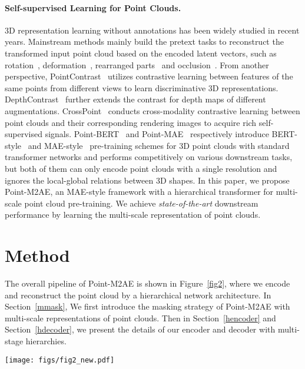 \documentclass{article}
\begin{document}
\paragraph{Self-supervised Learning for Point Clouds.}
3D representation learning without annotations has been widely studied in recent years. Mainstream methods mainly build the pretext tasks to reconstruct the transformed input point cloud based on the encoded latent vectors, such as rotation~\cite{poursaeed2020self}, deformation~\cite{achituve2021self}, rearranged parts~\cite{sauder2019self} and occlusion~\cite{occo}. From another perspective, PointContrast~\cite{pointcontrast} utilizes contrastive learning between features of the same points from different views to learn discriminative 3D representations. DepthContrast~\cite{depthcontrast} further extends the contrast for depth maps of different augmentations. CrossPoint~\cite{afham2022crosspoint} conducts cross-modality contrastive learning between point clouds and their corresponding rendering images to acquire rich self-supervised signals. Point-BERT~\cite{pointbert} and Point-MAE~\cite{pang2022masked} respectively introduce BERT-style~\cite{bert} and MAE-style~\cite{mae} pre-training schemes for 3D point clouds with standard transformer networks and performs competitively on various downstream tasks, but both of them can only encode point clouds with a single resolution and ignores the local-global relations between 3D shapes. In this paper, we propose Point-M2AE, an MAE-style framework with a hierarchical transformer for multi-scale point cloud pre-training. We achieve \textit{state-of-the-art} downstream performance by learning the multi-scale representation of point clouds.


\section{Method}
The overall pipeline of Point-M2AE is shown in Figure~\ref{fig2}, where we encode and reconstruct the point cloud by a hierarchical network architecture.
In Section~\ref{mmask}, We first introduce the masking strategy of Point-M2AE with multi-scale representations of point clouds. Then in Section~\ref{hencoder} and Section~\ref{hdecoder}, we present the details of our encoder and decoder with multi-stage hierarchies.

\begin{figure*}[t!]
  \centering
    \texttt{[image: figs/fig2\_new.pdf]}
    \vspace{0.01cm}
   \caption{\textbf{Overall pipeline of Point-M2AE.} After the multi-scale masking, we embed point tokens at the -st scale and feed the visible ones into a hierarchical encoder-decoder transformer, which captures both high-level semantics and fine-grained patterns of the point cloud during pre-training.}
    \label{fig2}
    \vspace{-0.3cm}
\end{figure*}
\end{document}
